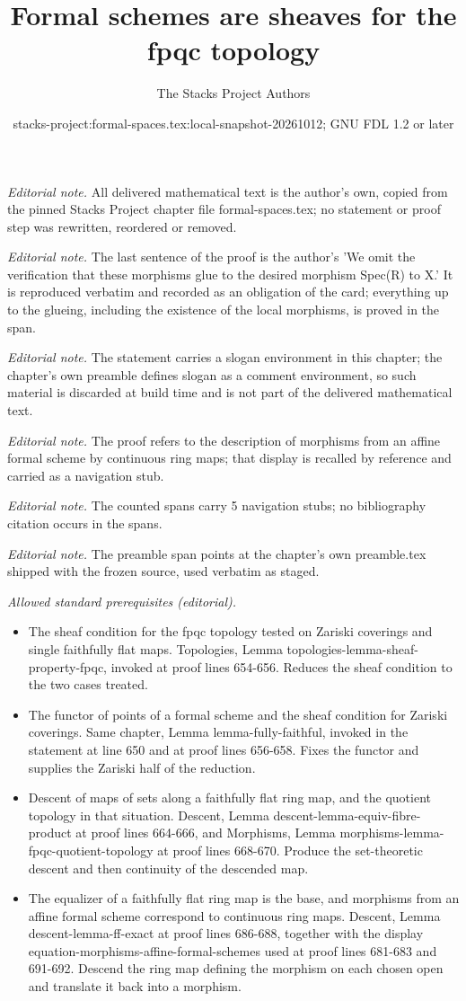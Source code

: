 \documentclass{stacks-project}
\title{Formal schemes are sheaves for the fpqc topology}
\author{The Stacks Project Authors}
\date{stacks-project:formal-spaces.tex:local-snapshot-20261012; GNU FDL 1.2 or later}
\theoremstyle{plain}
\theoremstyle{definition}
\theoremstyle{remark}
\numberwithin{equation}{subsection}
\begin{document}
\maketitle
\noindent\textit{Editorial note.} All delivered mathematical text is the author's own, copied from the pinned Stacks Project chapter file formal-spaces.tex; no statement or proof step was rewritten, reordered or removed.\par\medskip
\noindent\textit{Editorial note.} The last sentence of the proof is the author's 'We omit the verification that these morphisms glue to the desired morphism Spec(R) to X.' It is reproduced verbatim and recorded as an obligation of the card; everything up to the glueing, including the existence of the local morphisms, is proved in the span.\par\medskip
\noindent\textit{Editorial note.} The statement carries a slogan environment in this chapter; the chapter's own preamble defines slogan as a comment environment, so such material is discarded at build time and is not part of the delivered mathematical text.\par\medskip
\noindent\textit{Editorial note.} The proof refers to the description of morphisms from an affine formal scheme by continuous ring maps; that display is recalled by reference and carried as a navigation stub.\par\medskip
\noindent\textit{Editorial note.} The counted spans carry 5 navigation stubs; no bibliography citation occurs in the spans.\par\medskip
\noindent\textit{Editorial note.} The preamble span points at the chapter's own preamble.tex shipped with the frozen source, used verbatim as staged.\par\medskip
\noindent\textit{Allowed standard prerequisites (editorial).}\begin{itemize}
\item The sheaf condition for the fpqc topology tested on Zariski coverings and single faithfully flat maps. Topologies, Lemma topologies-lemma-sheaf-property-fpqc, invoked at proof lines 654-656. Reduces the sheaf condition to the two cases treated.
\item The functor of points of a formal scheme and the sheaf condition for Zariski coverings. Same chapter, Lemma lemma-fully-faithful, invoked in the statement at line 650 and at proof lines 656-658. Fixes the functor and supplies the Zariski half of the reduction.
\item Descent of maps of sets along a faithfully flat ring map, and the quotient topology in that situation. Descent, Lemma descent-lemma-equiv-fibre-product at proof lines 664-666, and Morphisms, Lemma morphisms-lemma-fpqc-quotient-topology at proof lines 668-670. Produce the set-theoretic descent and then continuity of the descended map.
\item The equalizer of a faithfully flat ring map is the base, and morphisms from an affine formal scheme correspond to continuous ring maps. Descent, Lemma descent-lemma-ff-exact at proof lines 686-688, together with the display equation-morphisms-affine-formal-schemes used at proof lines 681-683 and 691-692. Descend the ring map defining the morphism on each chosen open and translate it back into a morphism.
\end{itemize}\medskip
\end{document}
